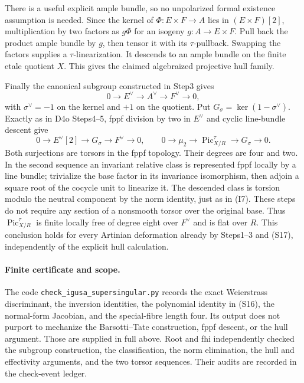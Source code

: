 There is a useful explicit ample bundle, so no unpolarized formal
existence assumption is needed. Since the kernel of
$\Phi:E\times F\to A$ lies in $(E\times F)[2]$, multiplication
by two factors as $g\Phi$ for an isogeny $g:A\to E\times F$.
Pull back the product ample bundle by $g$, then tensor it with its
$\tau$-pullback. Swapping the factors supplies a $\tau$-linearization.
It descends to an ample bundle on the finite etale quotient $X$.
This gives the claimed algebraized projective hull family.

Finally the canonical subgroup constructed in Step3 gives
\[
 0\longrightarrow E^\vee\longrightarrow A^\vee
 \longrightarrow F^\vee\longrightarrow0,
\]
with $\sigma^\vee=-1$ on the kernel and $+1$ on the quotient.
Put $G_\sigma=\ker(1-\sigma^\vee)$. Exactly as in D4o Steps4--5,
fppf division by two in $E^\vee$ and cyclic line-bundle descent give
\[
 0\longrightarrow E^\vee[2]\longrightarrow G_\sigma
 \longrightarrow F^\vee\longrightarrow0,
 \qquad
 0\longrightarrow\mu_2\longrightarrow
 \operatorname{Pic}^{\tau}_{X/R}\longrightarrow G_\sigma
 \longrightarrow0.                                    \tag{S17}
\]
Both surjections are torsors in the fppf topology. Their degrees
are four and two. In the second sequence an invariant relative
class is represented fppf locally by a line bundle; trivialize the
base factor in its invariance isomorphism, then adjoin a square root
of the cocycle unit to linearize it. The descended class is torsion
modulo the neutral component by the norm identity, just as in (I7).
These steps do not require any section of a nonsmooth torsor over
the original base. Thus $\operatorname{Pic}^{\tau}_{X/R}$ is finite
locally free of degree eight over $F^\vee$ and is flat over $R$.
This conclusion holds for every Artinian deformation already by
Steps1--3 and (S17), independently of the explicit hull calculation.

\paragraph{Finite certificate and scope.}
The code \texttt{check\_igusa\_supersingular.py} records the exact
Weierstrass discriminant, the inversion identities, the polynomial
identity in (S16), the normal-form Jacobian, and the special-fibre
length four. Its output does not purport to mechanize the
Barsotti--Tate construction, fppf descent, or the hull argument.
Those are supplied in full above. Root and fhi independently checked the subgroup construction, the
classification, the norm elimination, the hull and effectivity arguments,
and the two torsor sequences. Their audits are recorded in the
check-event ledger.
